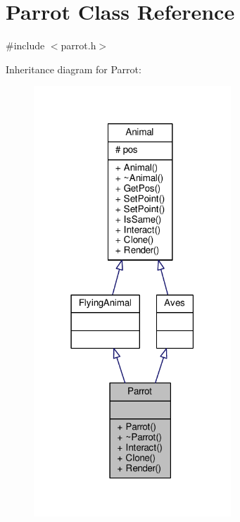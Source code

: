 \hypertarget{classParrot}{}\section{Parrot Class Reference}
\label{classParrot}


{\ttfamily \#include $<$parrot.\+h$>$}



Inheritance diagram for Parrot\+:
\nopagebreak
\begin{figure}[H]
\begin{center}
\leavevmode
\includegraphics[width=210pt]{classParrot__inherit__graph}
\end{center}
\end{figure}



